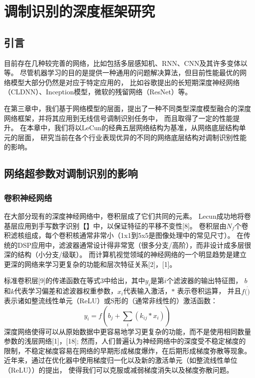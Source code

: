 \chapter{调制识别的深度框架研究}

\section{引言}

目前存在几种较完善的网络，比如包括多层感知机、RNN、CNN及其许多变体以等。
尽管机器学习的目的是提供一种通用的问题解决算法，但目前性能最优的网络模型大部分仍然是对应于特定应用的，
比如谷歌提出的长短期深度神经网络（CLDNN）、Inception模型，微软的残留网络（ResNet）等。 \par

在第三章中，我们基于网络模型的层面，提出了一种不同类型深度模型融合的深度网络框架，并将其应用到无线信号调制识别任务中，
而且取得了一定的性能提升。
在本章中，我们将以LeCun的经典五层网络结构为基准，从网络底层结构单元的层面，
研究当前在各个行业表现优异的不同的网络底层结构对调制识别性能的影响。

\section{网络超参数对调制识别的影响}

\subsection{卷积神经网络}

在大部分现有的深度神经网络中，卷积层成了它们共同的元素。
Lecun成功地将卷基层应用到手写数字识别【】中，以保证特征的平移不变性[8]。
卷积层由$N_f$个卷积滤核组成，每个卷积核通常非常小（1x1到5x5是图像处理中的常见尺寸）。
在传统的DSP应用中，滤波器通常设计得非常宽（很多分支/高阶），而非设计成多层很深的结构（小分支/级联）。
而计算机视觉领域的神经网络的一个明显趋势是建立更深的网络来学习更复杂的功能和层次特征关系[2]，[1]。\par

标准卷积层[9]的传递函数在等式3中给出，其中$y_i$是第$i$个滤波器的输出特征图，
$b$和$k$代表学习偏差和滤波器权重参数，$x_i$代表输入激活，$*$ 表示卷积运算，
并且$f(\dot)$表示诸如整流线性单元（ReLU）或S形的（通常非线性的）激活函数：
\begin{equation}
	y_i = f (b_j + \sum_{i}(k_{ij} * x_i))
\end{equation}
深度网络使得可以从原始数据中更容易地学习更复杂的功能，而不是使用相同数量参数的浅层网络[1]，[18];
然而，人们普遍认为神经网络中的深度受不稳定梯度的限制，不稳定梯度容易在网络的早期形成梯度爆炸，在后期形成梯度弥散等现象。
近年来，通过在优化器中使用梯度归一化以及新的激活单元（如整流线性单位（ReLU））的提出，
使得我们可以克服或减弱梯度消失以及梯度弥散问题。\par

